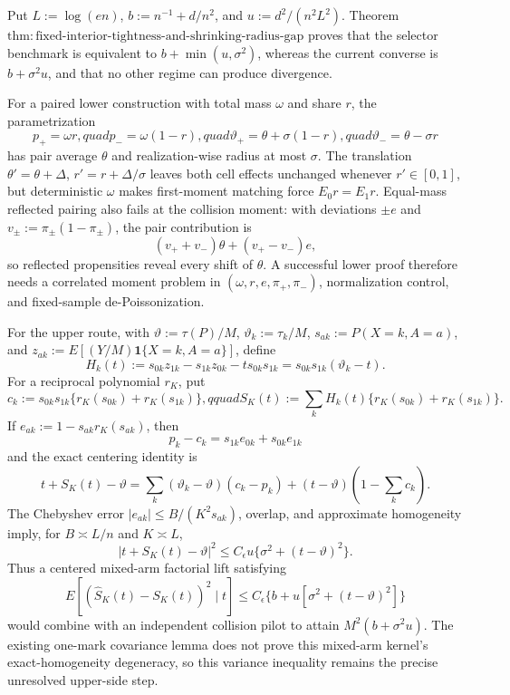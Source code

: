 Put \(L:=\log(en)\), \(b:=n^{-1}+d/n^2\), and \(u:=d^2/(n^2L^2)\).  Theorem~\(\mathrm{thm:fixed\text{-}interior\text{-}tightness\text{-}and\text{-}shrinking\text{-}radius\text{-}gap}\) proves that the selector benchmark is equivalent to \(b+\min(u,\sigma^2)\), whereas the current converse is \(b+\sigma^2u\), and that no other regime can produce divergence.

For a paired lower construction with total mass \(\omega\) and share \(r\), the parametrization
\[
 p_+=\omega r,quad p_-=\omega(1-r),quad
 \vartheta_+=\theta+\sigma(1-r),quad
 \vartheta_-=\theta-\sigma r
\]
has pair average \(\theta\) and realization-wise radius at most \(\sigma\).  The translation \(\theta'=\theta+\Delta\), \(r'=r+\Delta/\sigma\) leaves both cell effects unchanged whenever \(r'\in[0,1]\), but deterministic \(\omega\) makes first-moment matching force \(E_0r=E_1r\).  Equal-mass reflected pairing also fails at the collision moment: with deviations \(\pm e\) and \(v_\pm:=\pi_\pm(1-\pi_\pm)\), the pair contribution is
\[
 (v_++v_-)\theta+(v_+-v_-)e,
\]
so reflected propensities reveal every shift of \(\theta\).  A successful lower proof therefore needs a correlated moment problem in \((\omega,r,e,\pi_+,\pi_-)\), normalization control, and fixed-sample de-Poissonization.

For the upper route, with \(\vartheta:=\tau(P)/M\), \(\vartheta_k:=\tau_k/M\), \(s_{ak}:=P(X=k,A=a)\), and \(z_{ak}:=E[(Y/M)\mathbf1\{X=k,A=a\}]\), define
\[
 H_k(t):=s_{0k}z_{1k}-s_{1k}z_{0k}-ts_{0k}s_{1k}
 =s_{0k}s_{1k}(\vartheta_k-t).
\]
For a reciprocal polynomial \(r_K\), put
\[
 c_k:=s_{0k}s_{1k}\{r_K(s_{0k})+r_K(s_{1k})\},qquad
 S_K(t):=\sum_kH_k(t)\{r_K(s_{0k})+r_K(s_{1k})\}.
\]
If \(e_{ak}:=1-s_{ak}r_K(s_{ak})\), then
\[
 p_k-c_k=s_{1k}e_{0k}+s_{0k}e_{1k}
\]
and the exact centering identity is
\[
 t+S_K(t)-\vartheta
 =\sum_k(\vartheta_k-\vartheta)(c_k-p_k)
 +(t-\vartheta)\left(1-\sum_kc_k\right).
\]
The Chebyshev error \(|e_{ak}|\le B/(K^2s_{ak})\), overlap, and approximate homogeneity imply, for \(B\asymp L/n\) and \(K\asymp L\),
\[
 |t+S_K(t)-\vartheta|^2
 \le C_\epsilon u\{\sigma^2+(t-\vartheta)^2\}.
\]
Thus a centered mixed-arm factorial lift satisfying
\[
 E[(\widehat S_K(t)-S_K(t))^2\mid t]
 \le C_\epsilon\{b+u[\sigma^2+(t-\vartheta)^2]\}
\]
would combine with an independent collision pilot to attain \(M^2(b+\sigma^2u)\).  The existing one-mark covariance lemma does not prove this mixed-arm kernel's exact-homogeneity degeneracy, so this variance inequality remains the precise unresolved upper-side step.
